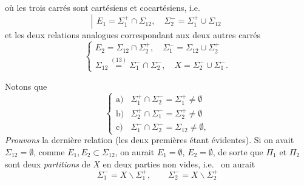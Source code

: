 \documentclass[11pt,a4paper]{article}
\begin{document}


où les trois carrés sont cartésiens et cocartésiens, i.e.
\[
  \left|
  \begin{array}{l}
    E_{1}=\Sigma_{1}^{+}\cap\Sigma_{12},\quad
    \Sigma_{2}^{-}=\Sigma_{1}^{+}\cup\Sigma_{12}
  \end{array}
  \right.
\]
et les deux relations analogues correspondant aux deux autres carrés
\[
  \left\{
  \begin{array}{l}
    E_{2}=\Sigma_{12}\cap\Sigma_{2}^{+},\quad
    \Sigma_{1}^{-}=\Sigma_{12}\cup\Sigma_{2}^{+}\\[4pt]
    \Sigma_{12}\overset{(13)}{=}\Sigma_{1}^{-}\cap\Sigma_{2}^{-},\quad
    X=\Sigma_{2}^{-}\cup\Sigma_{1}^{-} .
  \end{array}
  \right.
  \tag{15}
\]

Notons que
\[
  \left\{
  \begin{array}{ll}
    \text{a)} & \Sigma_{1}^{+}\cap\Sigma_{2}^{-}=\Sigma_{1}^{+}\neq\emptyset\\
    \text{b)} & \Sigma_{2}^{+}\cap\Sigma_{1}^{-}=\Sigma_{2}^{+}\neq\emptyset\\
    \text{c)} & \Sigma_{1}^{-}\cap\Sigma_{2}^{-}=\Sigma_{12}\neq\emptyset ,
  \end{array}
  \right.
  \tag{16}
\]
\emph{Prouvons} la dernière relation (les deux premières étant évidentes).
Si on avait $\Sigma_{12}=\emptyset$, comme $E_{1},E_{2}\subset\Sigma_{12}$,
on aurait $E_{1}=\emptyset$, $E_{2}=\emptyset$, de sorte que $\Pi_{1}$ et
$\Pi_{2}$ sont deux \emph{partitions} de $X$ en deux parties non vides, i.e.\
 on aurait
\[
  \Sigma_{1}^{-}=X\smallsetminus\Sigma_{1}^{+},\qquad
  \Sigma_{2}^{-}=X\smallsetminus\Sigma_{2}^{+}
\]
\end{document}
